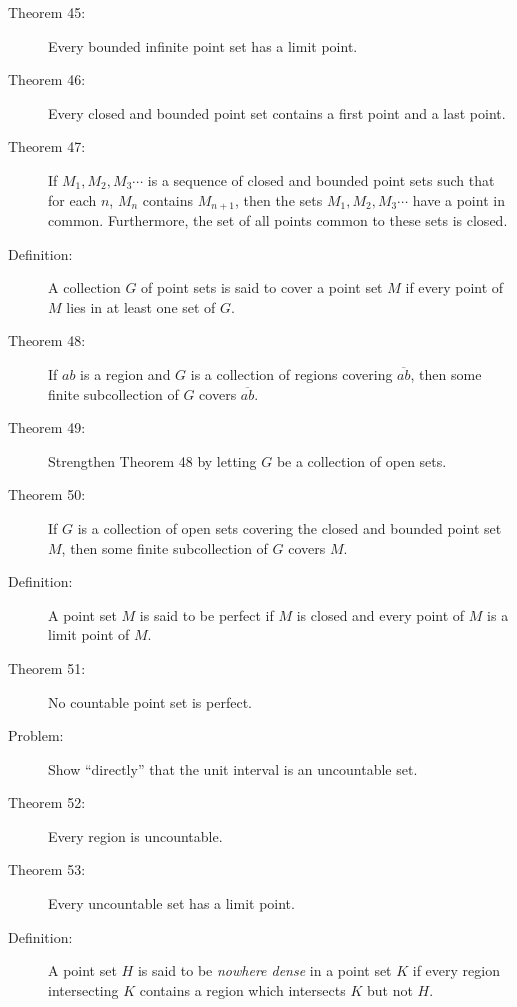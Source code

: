 \documentclass{article}
\begin{document}
\begin{description}
  \item[Theorem 45:] Every bounded infinite point set has a limit point.
  \item[Theorem 46:] Every closed and bounded point set contains a first point and a last point.
  \item[Theorem 47:] If $M_{1}, M_{2}, M_{3} \cdots$ is a sequence of closed and bounded point sets such that for each $n$, $M_{n}$ contains $M_{n+1}$, then the sets $M_{1}, M_{2}, M_{3} \cdots$ have a point in common. Furthermore, the set of all points common to these sets is closed.
  \item[Definition:] A collection $G$ of point sets is said to cover a point set $M$ if every point of $M$ lies in at least one set of $G$.
  \item[Theorem 48:] If $ab$ is a region and $G$ is a collection of regions covering $\overline{ab}$, then some finite subcollection of $G$ covers $\overline{ab}$.
  \item[Theorem 49:] Strengthen Theorem 48 by letting $G$ be a collection of open sets.
  \item[Theorem 50:] If $G$ is a collection of open sets covering the closed and bounded point set $M$, then some finite subcollection of $G$ covers $M$.
  \item[Definition:] A point set $M$ is said to be perfect if $M$ is closed and every point of $M$ is a limit point of $M$.
  \item[Theorem 51:] No countable point set is perfect.
  \item[Problem:] Show ``directly'' that the unit interval is an uncountable set.
  \item[Theorem 52:] Every region is uncountable.
  \item[Theorem 53:] Every uncountable set has a limit point.
  \item[Definition:] A point set $H$ is said to be \emph{nowhere dense} in a point set $K$ if every region intersecting $K$ contains a region which intersects $K$ but not $H$.


\end{description}
\end{document}
